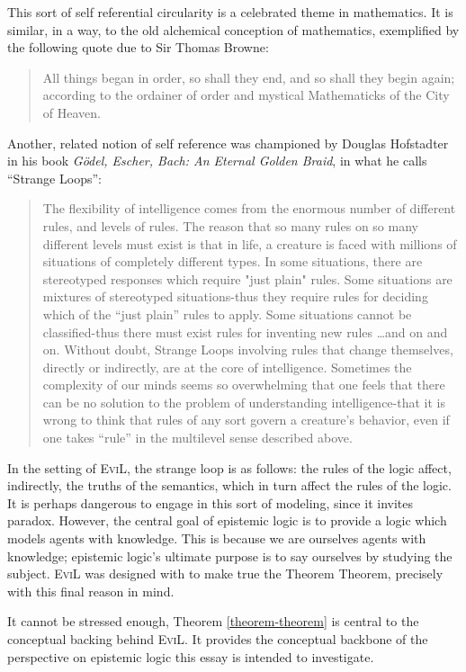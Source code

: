 This sort of self referential circularity is a celebrated theme in
mathematics. It is similar, in a way, to the old alchemical conception
of mathematics, exemplified by the following quote 
due to Sir Thomas Browne:
\begin{quote}
All things began in order, so shall they end, and so shall they begin
again; according to the ordainer of order and mystical Mathematicks of
the City of Heaven.\cite[chapter 5]{browne_garden_1736}\end{quote}
Another, related notion of self reference was championed by Douglas
Hofstadter in his book \emph{G\"odel, Escher, Bach: An Eternal Golden
  Braid}, in what he calls ``Strange Loops'':
\begin{quote}
The flexibility of intelligence comes from the enormous number of
different rules, and levels of rules. The reason that so many rules on
so many different levels must exist is that in life, a creature is
faced with millions of situations of completely different types. In
some situations, there are stereotyped responses which require "just
plain" rules. Some situations are mixtures of stereotyped
situations-thus they require rules for deciding which of the ``just
plain'' rules to apply. Some situations cannot be classified-thus
there must exist rules for inventing new rules \ldots and on and
on. Without doubt, Strange Loops involving rules that change
themselves, directly or indirectly, are at the core of
intelligence. Sometimes the complexity of our minds seems so
overwhelming that one feels that there can be no solution to the
problem of understanding intelligence-that it is wrong to think that rules of any sort govern a creature's behavior, even if one takes ``rule''
in the multilevel sense described above. \cite[pg. 24]{hofstadter_godel_1979}
\end{quote}
In the setting of \textsc{EviL}, the strange loop is as follows: the
rules of the logic affect, indirectly, the truths of the semantics,
which in turn affect the rules of the logic.  It is perhaps dangerous
to engage in this sort of modeling, since it invites paradox.
However, the central goal of epistemic logic is to
provide a logic which models agents with knowledge.  This is because we are
ourselves agents with knowledge; epistemic logic's ultimate purpose is
to say ourselves by studying the subject.  \textsc{EviL} was designed
with to make true the Theorem Theorem, precisely with this final
reason in mind.

It cannot be stressed enough, Theorem \ref{theorem-theorem} is central
to the conceptual backing behind \textsc{EviL}.  
It provides the conceptual backbone of the perspective on 
epistemic logic this essay is intended to investigate.


